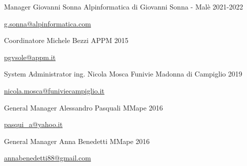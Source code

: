 

\begin{cventries}

  \cventry
    {Manager} %
    {Giovanni Sonna} %
    {Alpinformatica di Giovanni Sonna - Malè} %
    {2021-2022} %
    {
      \begin{cvitems} %
        \item {\href{mailto:g.sonna@alpinformatica.com}{g.sonna@alpinformatica.com}}
      \end{cvitems}
    }

  \cventry
    {Coordinatore} %
    {Michele Bezzi} %
    {APPM} %
    {2015} %
    {
      \begin{cvitems} %
        \item {\href{mailto:pgvsole@appm.it}{pgvsole@appm.it}}
      \end{cvitems}
    }

  \cventry
    {System Administrator} %
    {ing. Nicola Mosca} %
    {Funivie Madonna di Campiglio} %
    {2019} %
    {
      \begin{cvitems} %
        \item {\href{mailto:nicola.mosca@funiviecampiglio.it}{nicola.mosca@funiviecampiglio.it}}
      \end{cvitems}
    }

  \cventry
    {General Manager} %
    {Alessandro Pasquali} %
    {MMape} %
    {2016} %
    {
      \begin{cvitems} %
        \item {\href{mailto:pasqui\_a@yahoo.it}{pasqui\_a@yahoo.it}}
      \end{cvitems}
    }


  \cventry
    {General Manager} %
    {Anna Benedetti} %
    {MMape} %
    {2016} %
    {
      \begin{cvitems} %
        \item {\href{mailto:annabenedetti88@gmail.com}{annabenedetti88@gmail.com}}
      \end{cvitems}
    }
 
\end{cventries}
